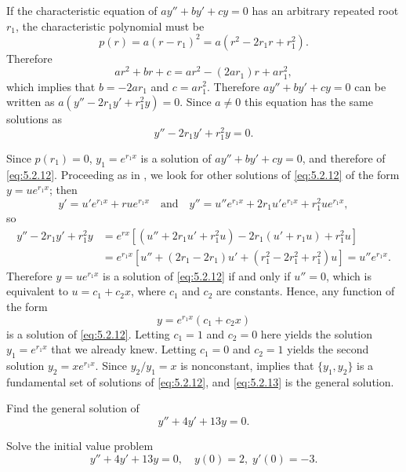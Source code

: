 If the characteristic equation of $ay''+by'+cy=0$
has an arbitrary repeated root $r_1$,  the
characteristic polynomial must be
\[
p(r)=a(r-r_1)^2=a(r^2-2r_1r+r_1^2).
\]
Therefore
\[
ar^2+br+c=ar^2-(2ar_1)r+ar_1^2,
\]
which implies that $b=-2ar_1$ and $c=ar_1^2$.
Therefore
 $ay''+by'+cy=0$ can be written as
$a(y''-2r_1y'+r_1^2y)=0$. Since $a\ne0$ this equation has the same
solutions as
\begin{equation} \label{eq:5.2.12}
y''-2r_1y'+r_1^2y=0.
\end{equation}

Since $p(r_1)=0$, $y_1=e^{r_1x}$ is a solution of
$ay''+by'+cy=0$, and therefore of \eqref{eq:5.2.12}. Proceeding as in
, we look for other solutions of \eqref{eq:5.2.12}
of the form $y=ue^{r_1x}$; then
\[
y'=u'e^{r_1x}+rue^{r_1x}\quad\text{and}\quad
y''=u''e^{r_1x}+2r_1u'e^{r_1x}+r_1^2ue^{r_1x},
\]
so
\begin{align*}
y''-2r_1y'+r_1^2y&=e^{rx}\left[(u''+2r_1u'+r_1^2u)-
2r_1(u'+r_1u)+r_1^2u\right]\\
&=e^{r_1x}\left[u''+(2r_1-2r_1)u'+(r_1^2-2r_1^2+r_1^2)u\right]=u''e^{r_1x}.
\end{align*}
Therefore $y=ue^{r_1x}$ is a solution of \eqref{eq:5.2.12} if and only if
$u''=0$, which is equivalent to $u=c_1+c_2x$, where $c_1$ and $c_2$
are constants. Hence, any function of the form
\begin{equation} \label{eq:5.2.13}
y=e^{r_1x}(c_1+c_2x)
\end{equation}
is  a solution of \eqref{eq:5.2.12}.
Letting $c_1=1$ and $c_2=0$ here yields the solution
 $y_1=e^{r_1x}$ that we already knew. Letting $c_1=0$ and $c_2=1$
yields the second solution $y_2=xe^{r_1x}$. Since
$y_2/y_1=x$
is nonconstant,  implies that   $\{y_1,y_2\}$ is
a fundamental set of solutions of \eqref{eq:5.2.12}, and \eqref{eq:5.2.13}
is the general solution.



\begin{example}\label{example:5.2.3}
\begin{alist}
\item %
Find the general solution of
\begin{equation} \label{eq:5.2.14}
y''+4y'+13y=0.
\end{equation}

\item %
Solve the initial value problem
\begin{equation} \label{eq:5.2.15}
y''+4y'+13y=0, \quad   y(0)=2,\;  y'(0)=-3.
\end{equation}
\end{alist}
\end{example}

